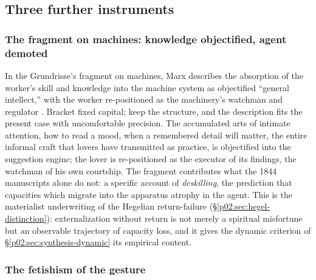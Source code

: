 \documentclass[11pt,a4paper]{article}
\begin{document}
\subsection{Three further instruments}
\label{p02:sec:marx-instruments}

\subsubsection{The fragment on machines: knowledge objectified, agent demoted}
\label{p02:sec:marx-fragment}

In the Grundrisse's fragment on machines, Marx describes the absorption of the worker's skill and knowledge into the machine system as objectified ``general intellect,'' with the worker re-positioned as the machinery's watchman and regulator \parencite{marx1857grundrisse}. Bracket fixed capital; keep the structure, and the description fits the present case with uncomfortable precision. The accumulated arts of intimate attention, how to read a mood, when a remembered detail will matter, the entire informal craft that lovers have transmitted as practice, is objectified into the suggestion engine; the lover is re-positioned as the executor of its findings, the watchman of his own courtship. The fragment contributes what the 1844 manuscripts alone do not: a specific account of \emph{deskilling}, the prediction that capacities which migrate into the apparatus atrophy in the agent. This is the materialist underwriting of the Hegelian return-failure (\S\ref{p02:sec:hegel-distinction}): externalization without return is not merely a spiritual misfortune but an observable trajectory of capacity loss, and it gives the dynamic criterion of \S\ref{p02:sec:synthesis-dynamic} its empirical content.

\subsubsection{The fetishism of the gesture}
\label{p02:sec:marx-fetish}
\end{document}
